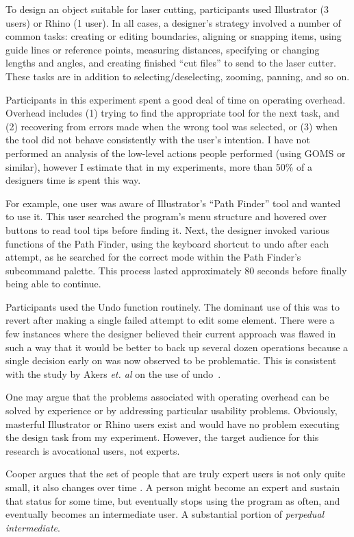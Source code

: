 \documentclass[12pt]{article}
\begin{document}
To design an object suitable for laser cutting, participants used
Illustrator (3 users) or Rhino (1 user). In all cases, a designer's
strategy involved a number of common tasks: creating or editing
boundaries, aligning or snapping items, using guide lines or reference
points, measuring distances, specifying or changing lengths and
angles, and creating finished ``cut files'' to send to the laser
cutter. These tasks are in addition to selecting/deselecting, zooming,
panning, and so on.

Participants in this experiment spent a good deal of time on operating
overhead. Overhead includes (1) trying to find the appropriate tool
for the next task, and (2) recovering from errors made when the wrong
tool was selected, or (3) when the tool did not behave consistently
with the user's intention. I have not performed an analysis of the
low-level actions people performed (using GOMS or
similar\cite{unknown}), however I estimate that in my experiments,
more than 50\% of a designers time is spent this way.

For example, one user was aware of Illustrator's ``Path Finder'' tool
and wanted to use it. This user searched the program's menu structure
and hovered over buttons to read tool tips before finding it. Next,
the designer invoked various functions of the Path Finder, using the
keyboard shortcut to undo after each attempt, as he searched for the
correct mode within the Path Finder's subcommand palette. This process
lasted approximately 80 seconds before finally being able to continue.

Participants used the Undo function routinely. The dominant use of
this was to revert after making a single failed attempt to edit some
element. There were a few instances where the designer believed their
current approach was flawed in such a way that it would be better to
back up several dozen operations because a single decision early on
was now observed to be problematic. This is consistent with the study
by Akers \textit{et. al} on the use of undo~\cite{akers-undo}.

One may argue that the problems associated with operating overhead can
be solved by experience or by addressing particular usability
problems. Obviously, masterful Illustrator or Rhino users exist and
would have no problem executing the design task from my
experiment. However, the target audience for this research is
avocational users, not experts.

Cooper argues that the set of people that are truly expert users is
not only quite small, it also changes over time
\cite{cooper-inmates}. A person might become an expert and sustain
that status for some time, but eventually stops using the program as
often, and eventually becomes an intermediate user. A substantial
portion of \textit{perpedual intermediate}.
\end{document}
